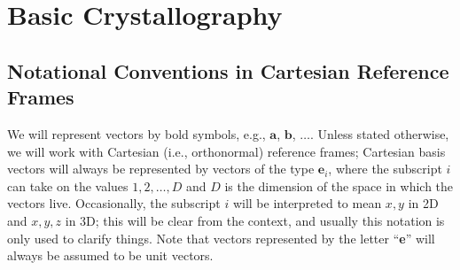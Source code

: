 %




\renewcommand{\chaptergraphicspath}{src/Crystallography/eps/}

\chapterimage{\noheaderimage}

\chapter{Basic Crystallography\label{chap:Crystallography}}



\section{Notational Conventions in Cartesian Reference Frames\label{ssec:notations}}
We will represent vectors by bold symbols, e.g.,  $\mathbf{a}$, $\mathbf{b}$, $\ldots$.  Unless stated otherwise, we will work with Cartesian (i.e., orthonormal) reference frames; Cartesian basis vectors will always be represented by vectors of the type $\mathbf{e}_i$, where the subscript $i$ can take on the values $1, 2, \ldots, D$ and $D$ is the dimension of the space in which the vectors live.  Occasionally, the subscript $i$ will be interpreted to mean $x, y$ in 2D and $x,y,z$ in 3D; this will be clear from the context, and usually this notation is only used to clarify things.  Note that vectors represented by the letter ``\textbf{e}'' will always be assumed to be unit vectors.

